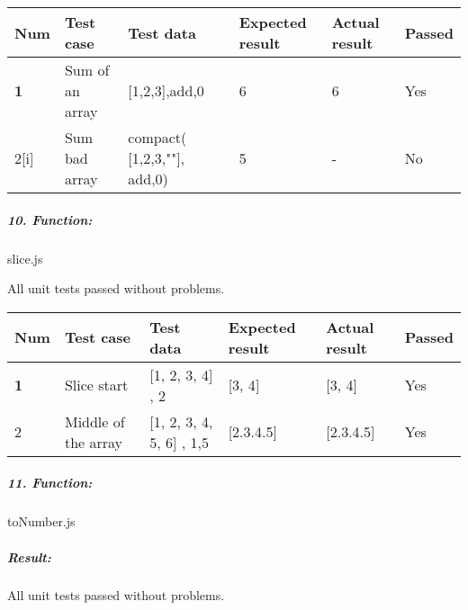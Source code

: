 \documentclass[a4paper, 12pt]{article}
\begin{document}
        \begin{table}[h!]
           \begin{tabular}{|l|p{3cm}|p{2cm}|p{2cm}|p{2.5cm}|l|}
                \hline
                Num & Test case        					& Test data 					& Expected result 					& Actual result 		& Passed \\ \hline
                \textbf{1}   & Sum of an array 					& {[}1,2,3{]},add,0     		& 6                					& 6             		& Yes     \\ \hline
                  2[i]   & Sum bad array	& compact( {[}1,2,3,""{]}, add,0)      		& 5            			& -                		& No     \\ \hline
            \end{tabular}
        \end{table}

		\hypertarget{header-n472}{%
		\subparagraph{10. Function:}\label{header-n472}}
		
		slice.js
	
		
		All unit tests passed without problems.

\begin{table}[h!]
           \begin{tabular}{|l|p{3cm}|p{2cm}|p{2cm}|p{2.5cm}|l|}
                \hline
                Num & Test case        							& Test data 					& Expected result 					& Actual result 		& Passed \\ \hline
                \textbf{1}   & Slice start	& {[}1, 2, 3, 4{]} , 2     		& {[}3, 4{]}               			& {[}3, 4{]}                 		& Yes     \\ \hline
                  2   & Middle of the array	& {[}1, 2, 3, 4, 5, 6{]} , 1,5     		& {[}2.3.4.5{]}               			& {[}2.3.4.5{]}                		& Yes     \\ \hline
            \end{tabular}
        \end{table}
        

		\hypertarget{header-n515}{%
		\subparagraph{11. Function:}\label{header-n515}}
		
		toNumber.js
		

		
	
		
		\hypertarget{header-n526}{%
		\subparagraph{Result:}\label{header-n526}}
		
		All unit tests passed without problems.
\end{document}
